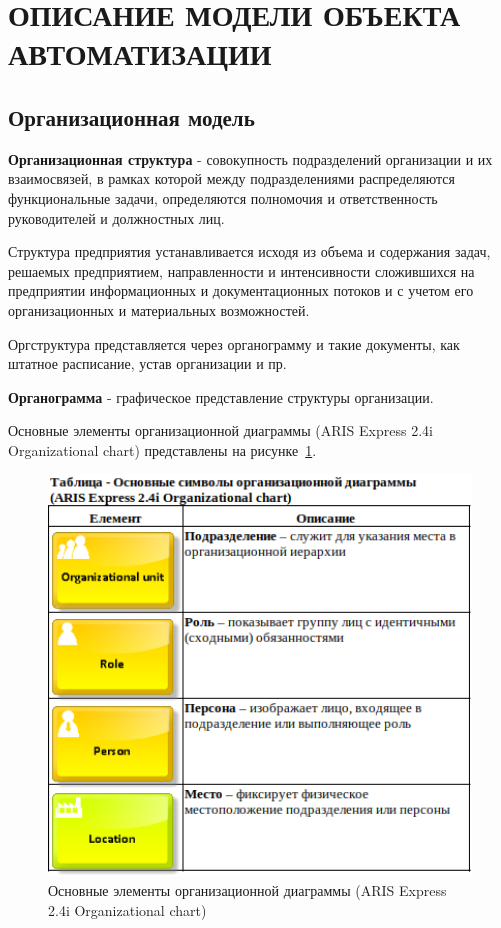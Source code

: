 \section{ОПИСАНИЕ МОДЕЛИ ОБЪЕКТА АВТОМАТИЗАЦИИ}
\subsection{Организационная модель}

\textbf{Организационная структура} - совокупность подразделений организации и их взаимосвязей,
в рамках которой между подразделениями распределяются функциональные задачи,
определяются полномочия и ответственность руководителей и должностных лиц.

Структура предприятия устанавливается исходя из объема и содержания задач,
решаемых предприятием, направленности и интенсивности сложившихся на предприятии
информационных и документационных потоков и с учетом его организационных и материальных возможностей.

Оргструктура представляется через органограмму и такие документы, как штатное расписание,
устав организации и пр.

\textbf{Органограмма} - графическое представление структуры организации.

Основные элементы организационной диаграммы (ARIS Express 2.4i \cite{ArisExpress} Organizational chart)
представлены на рисунке~\ref{fig:ArisOrganizationalChartElements}.

\begin{figure}[!h]
    \centering
    \includegraphics[width=13cm]
    {assets/ARIS/OrganizationalChart/Elements/ArisOrganizationalChartElements.png}
    \caption{Основные элементы организационной диаграммы (ARIS Express 2.4i Organizational chart)}
    \label{fig:ArisOrganizationalChartElements}
\end{figure}

